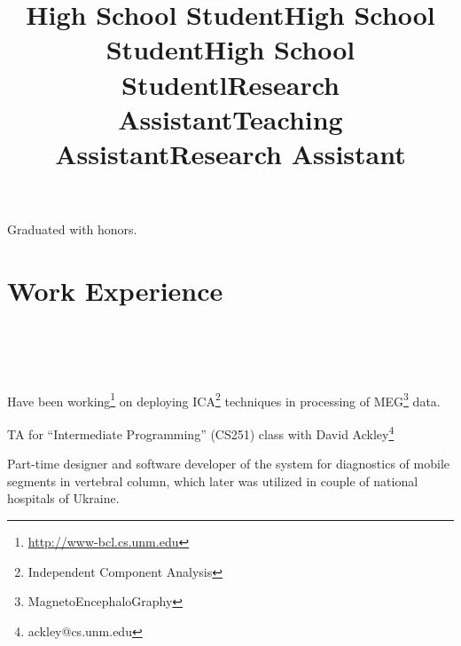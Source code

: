 \documentclass[10pt, overlapped, line]{res}
\begin{document}
\begin{resume}
\title{High School Student}
\begin{position}
 Graduated with honors.
\end{position}

\title{High School Student}
\begin{position}
\end{position}


\title{High School Student}
\begin{position}
\end{position}
 

\section{Work Experience}
\begin{format}
  \title{l}\\
  \\
  \body\\
\end{format}


\title{Research Assistant}
\begin{position}
 Have been working\footnote{\href{URL}{http://www-bcl.cs.unm.edu}} on deploying ICA\footnote{Independent Component Analysis} techniques in processing of
MEG\footnote{MagnetoEncephaloGraphy} data. 
\end{position}

\title{Teaching Assistant}
\begin{position}
  TA for ``Intermediate Programming'' (CS251) class with David
  Ackley\footnote{ackley@cs.unm.edu}
\end{position}


\title{Research Assistant}
\begin{position}
Part-time designer and software developer of the system for
diagnostics of mobile segments in vertebral column, which later was
utilized in couple of national hospitals of Ukraine.
\end{position}


\end{resume}
\end{document}
